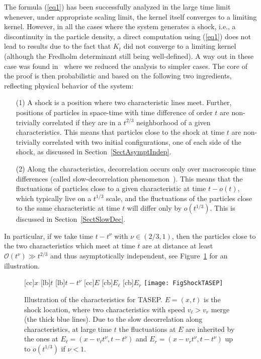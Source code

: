 \documentclass[12pt,a4paper]{article}
\numberwithin{equation}{section}
\newcommand{\Or}{\mathcal{O}}
\begin{document}
The formula (\ref{eq1}) has been successfully analyzed in the large time limit whenever, under appropriate scaling limit, the kernel itself converges to a limiting kernel. However, in all the cases where the system generates a shock, i.e., a discontinuity in the particle density, a direct computation using (\ref{eq1}) does not lead to results due to the fact that $K_t$ did not converge to a limiting kernel (although the Fredholm determinant still being well-defined). A way out in these case was found in~\cite{FN13} where we reduced the analysis to simpler cases. The core of the proof is then probabilistic and based on the following two ingredients, reflecting physical behavior of the system:
\begin{itemize}
\item[(1)] A shock is a position where two characteristic lines meet. Further, positions of particles in space-time with time difference of order $t$ are non-trivially correlated if they are in a $t^{2/3}$ neighborhood of a given characteristics. This means that particles close to the shock at time $t$ are non-trivially correlated with two initial configurations, one of each side of the shock, as discussed in Section~\ref{SectAsymptIndep}.
\item[(2)] Along the characteristics, decorrelation occurs only over macroscopic time differences (called slow-decorrelation phenomenon~\cite{Fer07,CFP10b}). This means that the fluctuations of particles close to a given characteristic at time $t-o(t)$, which typically live on a $t^{1/3}$ scale, and the fluctuations of the particles close to the same characteristic at time $t$ will differ only by $o(t^{1/3})$. This is discussed in Section~\ref{SectSlowDec}.
\end{itemize}
In particular, if we take time $t-t^\nu$ with $\nu\in (2/3,1)$, then the particles close to the two characteristics which meet at time $t$ are at distance at least $\Or(t^\nu)\gg t^{2/3}$ and thus asymptotically independent, see Figure~\ref{FigShockTASEP} for an illustration.
\begin{figure}
\begin{center}
[cc]{$x$}
[lb]{$t$}
[lb]{$t-t^\nu$}
[cc]{$E$}
[cb]{$E_\ell$}
[cb]{$E_r$}
\texttt{[image: FigShockTASEP]}
\caption{Illustration of the characteristics for TASEP. $E=(x,t)$ is the shock location, where two characteristics with speed $v_\ell>v_r$ merge (the thick blue lines). Due to the slow decorrelation along characteristics, at large time $t$ the fluctuations at $E$ are inherited by the ones at $E_\ell=(x-v_\ell t^\nu,t-t^\nu)$ and $E_r=(x-v_r t^\nu,t-t^\nu)$ up to $o(t^{1/3})$ if $\nu<1$.}
\label{FigShockTASEP}
\end{center}
\end{figure}
\end{document}
